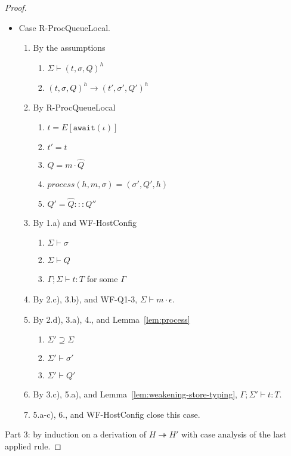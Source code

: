 \documentclass{article}
\theoremstyle{definition}
\begin{document}
\begin{proof}
\begin{itemize}
\item Case R-ProcQueueLocal.
\begin{enumerate}
\item By the assumptions
  \begin{enumerate}[label=(\alph*)]
  \item $\Sigma \vdash (t, \sigma, Q)^h$
  \item $(t, \sigma, Q)^h \longrightarrow (t', \sigma', Q')^h$
  \end{enumerate}
\item By R-ProcQueueLocal
  \begin{enumerate}[label=(\alph*)]
  \item $t = E[\texttt{await}(\iota)]$
  \item $t' = t$
  \item $Q = m \cdot \hat{Q}$
  \item $process(h, m, \sigma) = (\sigma', Q', h)$
  \item $Q' = \hat{Q} ::: Q''$
  \end{enumerate}
\item By 1.a) and WF-HostConfig
  \begin{enumerate}[label=(\alph*)]
  \item $\Sigma \vdash \sigma$
  \item $\Sigma \vdash Q$
  \item $\Gamma ; \Sigma \vdash t : T$ for some $\Gamma$
  \end{enumerate}
\item By 2.c), 3.b), and WF-Q1-3, $\Sigma \vdash m \cdot \epsilon$.
\item By 2.d), 3.a), 4., and Lemma~\ref{lem:process}
  \begin{enumerate}[label=(\alph*)]
  \item $\Sigma' \supseteq \Sigma$
  \item $\Sigma' \vdash \sigma'$
  \item $\Sigma' \vdash Q'$
  \end{enumerate}
\item By 3.c), 5.a), and Lemma~\ref{lem:weakening-store-typing}, $\Gamma ; \Sigma' \vdash t : T$.
\item 5.a-c), 6., and WF-HostConfig close this case.

\end{enumerate}
\end{itemize}

Part 3: by induction on a derivation of $H \twoheadrightarrow H'$ with case analysis of the last applied rule.


\end{proof}
\end{document}
